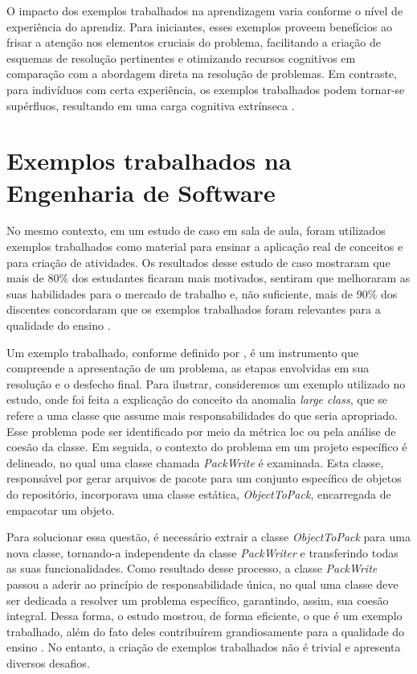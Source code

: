 O impacto dos exemplos trabalhados na aprendizagem varia conforme o nível de experiência do aprendiz. Para iniciantes, esses exemplos proveem benefícios ao frisar a atenção nos elementos cruciais do problema, facilitando a criação de esquemas de resolução pertinentes e otimizando recursos cognitivos em comparação com a abordagem direta na resolução de problemas. Em contraste, para indivíduos com certa experiência, os exemplos trabalhados podem tornar-se supérfluos, resultando em uma carga cognitiva extrínseca \cite{Skudder-LuxtonReilly:2014}.

\section{Exemplos trabalhados na Engenharia de Software}

No mesmo contexto, em um estudo de caso em sala de aula, foram utilizados exemplos trabalhados como material para ensinar a aplicação real de conceitos e para criação de atividades. Os resultados desse estudo de caso mostraram que mais de 80\% dos estudantes ficaram mais motivados, sentiram que melhoraram as suas habilidades para o mercado de trabalho e, não suficiente, mais de 90\% dos discentes concordaram que os exemplos trabalhados foram relevantes para a qualidade do ensino \cite{Simone.Tonhao-etal:2021}.

Um exemplo trabalhado, conforme definido por , é um instrumento que compreende a apresentação de um problema, as etapas envolvidas em sua resolução e o desfecho final. Para ilustrar, consideremos um exemplo utilizado no estudo, onde foi feita a explicação do conceito da anomalia \textit{large class}, que se refere a uma classe que assume mais responsabilidades do que seria apropriado. Esse problema pode ser identificado por meio da métrica \gls{loc} ou pela análise de coesão da classe. Em seguida, o contexto do problema em um projeto específico é delineado, no qual uma classe chamada \textit{PackWrite} é examinada. Esta classe, responsável por gerar arquivos de pacote para um conjunto específico de objetos do repositório, incorporava uma classe estática, \textit{ObjectToPack}, encarregada de empacotar um objeto.

Para solucionar essa questão, é necessário extrair a classe \textit{ObjectToPack} para uma nova classe, tornando-a independente da classe \textit{PackWriter} e transferindo todas as suas funcionalidades. Como resultado desse processo, a classe \textit{PackWrite} passou a aderir ao princípio de responsabilidade única, no qual uma classe deve ser dedicada a resolver um problema específico, garantindo, assim, sua coesão integral. Dessa forma, o estudo mostrou, de forma eficiente, o que é um exemplo trabalhado, além do fato deles contribuírem grandiosamente para a qualidade do ensino \cite{Simone.Tonhao-etal:2021}. No entanto, a criação de exemplos trabalhados não é trivial e apresenta diversos desafios.

